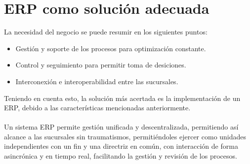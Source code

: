 \chapter{ERP como soluci\'on adecuada}
%
La necesidad del negocio se puede resumir en los siguientes puntos:%
%
\begin{itemize}
\item Gesti\'on y soporte de los procesos para optimizaci\'on constante.
\item Control y seguimiento para permitir toma de desiciones.
\item Interconexi\'on e interoperabilidad entre las sucursales.
\end{itemize}
%
Teniendo en cuenta esto, la soluci\'on m\'as acertada es la implementaci\'on de un ERP, debido a las caracter\'isticas mencionadas anteriormente.%
\\%
\\%
Un sistema ERP permite gesti\'on unificada y descentralizada, permitiendo as\'i alcance a las sucursales sin traumatismos, permiti\'endoles ejercer como unidades independientes con un fin y una directriz en com\'un, con interacci\'on de forma asincr\'onica y en tiempo real, facilitando la gesti\'on y revisi\'on de los procesos.%

